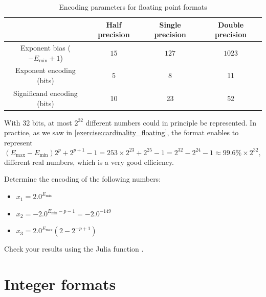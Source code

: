 \begin{table}[ht]
    \centering
    \begin{tabular}{|c|c|c|c|}
        \hline
        & Half precision & Single precision & Double precision
        \\ \hline
        Exponent bias ($-E_{\min} + 1$) & $15$ & $127$ & $1023$
        \\ \hline
        Exponent encoding (bits) & 5 & 8 & 11
        \\ \hline
        Significand encoding (bits) & 10 & 23 & 52
        \\ \hline
    \end{tabular}
    \caption{Encoding parameters for floating point formats}%
    \label{table:floating_point_formats_encoding}
\end{table}

\begin{remark}
    With 32 bits,
    at most $2^{32}$ different numbers could in principle be represented.
    In practice, as we saw in \cref{exercise:cardinality_floating},
    the  format enables to represent
    \[
        (E_{\max} - E_{\min}) 2^{p} + 2^{p+1} - 1
        = 253 \times 2^{23} + 2^{25} - 1
        = 2^{32} - 2^{24} - 1
        \approx 99.6 \% \times 2^{32},
    \]
    different real numbers,
    which is a very good efficiency.
\end{remark}

\begin{exercise}
    Determine the encoding of the following  numbers:
    \begin{itemize}
        \item $x_1 = 2.0^{E_{\min}}$
        \item $x_2 = - 2.0^{E_{\min} - p - 1} = - 2.0^{-149}$
        \item $x_3 =2.0^{E_{\max}} (2-2^{-p+1})$
    \end{itemize}
    Check your results using the Julia function .
\end{exercise}

\section{Integer formats}%
\label{sec:what_about_integer_formats}

